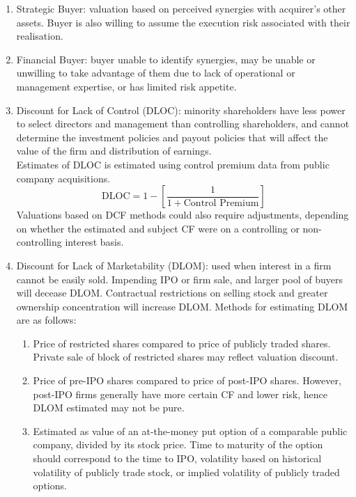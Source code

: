 \begin{remark} 
\begin{enumerate}[label=\roman*.]
\setlength{\itemsep}{0pt}
\item Strategic Buyer: valuation based on perceived synergies with acquirer's other assets. Buyer is also willing to assume the execution risk associated with their realisation.
\item Financial Buyer: buyer unable to identify synergies, may be unable or unwilling to take advantage of them due to lack of operational or management expertise, or has limited risk appetite.
\item Discount for Lack of Control (DLOC): minority shareholders have less power to select directors and management than controlling shareholders, and cannot determine the investment policies and payout policies that will affect the value of the firm and distribution of earnings. \\
Estimates of DLOC is estimated using control premium data from public company acquisitions.
\begin{equation}
\text{DLOC} = 1 - \left[\frac{1}{1 + \text{Control Premium}} \right] \nonumber
\end{equation}
Valuations based on DCF methods could also require adjustments, depending on whether the estimated and subject CF were on a controlling or non-controlling interest basis.
\item Discount for Lack of Marketability (DLOM): used when interest in a firm cannot be easily sold. Impending IPO or firm sale, and larger pool of buyers will decease DLOM. Contractual restrictions on selling stock and greater ownership concentration will increase DLOM. Methods for estimating DLOM are as follows:
\begin{enumerate}[label=\arabic*.]
\setlength{\itemsep}{0pt}
\item Price of restricted shares compared to price of publicly traded shares. Private sale of block of restricted shares may reflect valuation discount.
\item Price of pre-IPO shares compared to price of post-IPO shares. However, post-IPO firms generally have more certain CF and lower risk, hence DLOM estimated may not be pure.
\item Estimated as value of an at-the-money put option of a comparable public company, divided by its stock price. Time to maturity of the option should correspond to the time to IPO, volatility based on historical volatility of publicly trade stock, or implied volatility of publicly traded options.\\

\end{enumerate}
\end{enumerate}
\end{remark}
